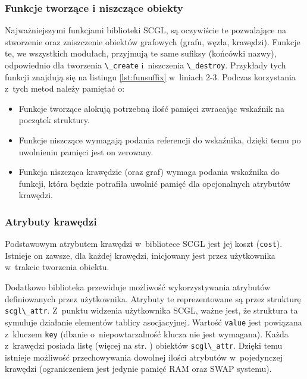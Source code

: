 \documentclass[a4paper,12pt,polish,twoside,openright]{thesis}
\newcommand\code[1]{\lstinline[style=line]{#1}}
\begin{document}
\subsubsection*{Funkcje tworzące i niszczące obiekty}
Najważniejszymi funkcjami biblioteki SCGL, są oczywiście te pozwalające na stworzenie oraz zniszczenie obiektów grafowych (grafu, węzła, krawędzi).
Funkcje te, we wszystkich modułach, przyjmują te same sufiksy (końcówki nazwy), odpowiednio dla tworzenia \code{\_create} i~niszczenia \code{\_destroy}.
Przykłady tych funkcji znajdują się na listingu \ref{lst:funsuffix} w~liniach 2-3. Podczas korzystania z~tych metod należy pamiętać o:
\begin{itemize}
	\item Funkcje tworzące alokują potrzebną ilość pamięci zwracając wskaźnik na początek struktury.
	\item Funkcje niszczące wymagają podania referencji do wskaźnika, dzięki temu po uwolnieniu pamięci jest on zerowany.
	\item Funkcja niszcząca krawędzie (oraz graf) wymaga podania wskaźnika do funkcji, która będzie potrafiła uwolnić pamięć dla opcjonalnych atrybutów krawędzi.
\end{itemize}

\subsubsection*{Atrybuty krawędzi}
Podstawowym atrybutem krawędzi w~bibliotece SCGL jest jej koszt (\code{cost}).
Istnieje on zawsze, dla każdej krawędzi, inicjowany jest przez użytkownika w~trakcie tworzenia obiektu.

Dodatkowo biblioteka przewiduje możliwość wykorzystywania atrybutów definiowanych przez użytkownika.
Atrybuty te reprezentowane są przez strukturę \code{scgl\_attr}.
Z~punktu widzenia użytkownika SCGL, ważne jest, że struktura ta symuluje działanie elementów tablicy asocjacyjnej.
Wartość \code{value} jest powiązana z~kluczem \code{key} (dbanie o~niepowtarzalność klucza nie jest wymagana).
Każda z~krawędzi posiada listę (więcej na str. \pageref{chap:lists}) obiektów \code{scgl\_attr}.
Dzięki temu istnieje możliwość przechowywania dowolnej ilości atrybutów w~pojedynczej krawędzi (ograniczeniem jest jedynie pamięć RAM oraz SWAP systemu).
\end{document}
